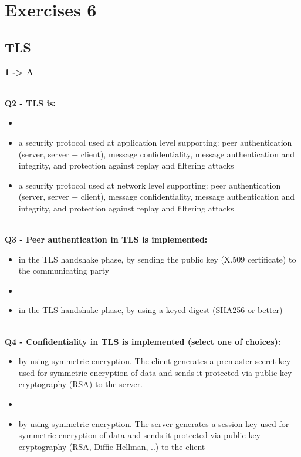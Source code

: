 \chapter{Exercises 6}

\section{TLS}
\textbf{1 -> A}

\textbf{\\Q2 - TLS is:}
\begin{itemize}
	\item[A.] 
	\item[B.] a security protocol used at application level supporting: peer authentication (server, server + client), message confidentiality, message authentication and integrity, and protection against replay and filtering attacks
	\item[C.] a security protocol used at network level supporting: peer authentication (server, server + client), message confidentiality, message authentication and integrity, and protection against replay and filtering attacks
\end{itemize}

\textbf{\\Q3 - Peer authentication in TLS is implemented:}
\begin{itemize}
	\item[A.] in the TLS handshake phase, by sending the public key (X.509 certificate) to the communicating party
	\item[B.] 
	\item[C.] in the TLS handshake phase, by using a keyed digest (SHA256 or better)
\end{itemize}
\com{}

\textbf{\\Q4 - Confidentiality in TLS is implemented (select one of choices):}
\begin{itemize}
	\item[A.] by using symmetric encryption. The client generates a premaster secret key used for symmetric encryption of data and sends it protected via public key cryptography (RSA) to the server.
	\item[B.] 
	\item[C.] by using symmetric encryption. The server generates a session key used for symmetric encryption of data and sends it protected via public key cryptography (RSA, Diffie-Hellman, ..) to the client
\end{itemize}



